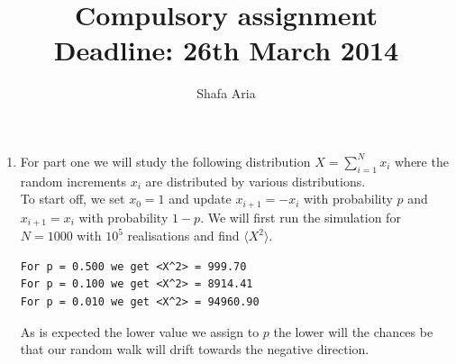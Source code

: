 \documentclass{article}
\begin{document}
\title{Compulsory assignment\\Deadline: 26th March 2014}
\author{Shafa Aria}
\maketitle
\begin{enumerate}[I]
\item For part one we will study the following distribution $X = \sum_{i=1}^N x_i$ where the random increments $x_i$ are distributed by various distributions.\\

To start off, we set $x_0 = 1$ and update $x_{i+1}=-x_i$ with probability $p$ and $x_{i+1} = x_i$ with probability $1-p$. We will first run the simulation for $N=1000$ with $10^5$ realisations and find $\langle X^2\rangle$. 
\begin{verbatim}
For p = 0.500 we get <X^2> = 999.70
For p = 0.100 we get <X^2> = 8914.41
For p = 0.010 we get <X^2> = 94960.90
\end{verbatim}
As is expected the lower value we assign to $p$ the lower will the chances be that our random walk will drift towards the negative direction.


\end{enumerate}
\end{document}
